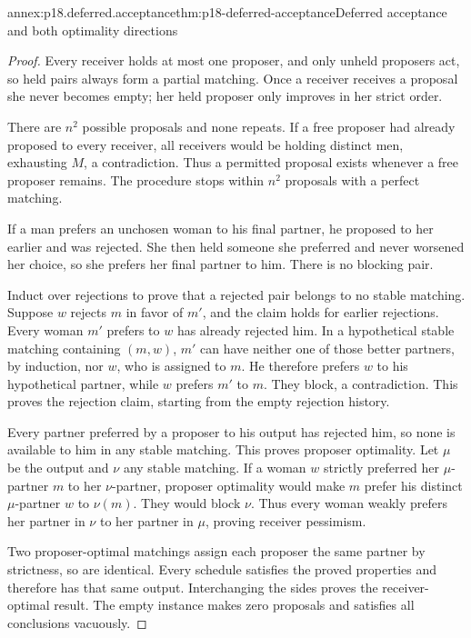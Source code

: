 \begin{annexitem}{annex:p18.deferred.acceptance}{thm:p18-deferred-acceptance}{Deferred acceptance and both optimality directions}
\begin{proof}
Every receiver holds at most one proposer,
and only unheld proposers act, so
held pairs always form a partial
matching. Once a receiver receives
a proposal she never becomes empty;
her held proposer only improves
in her strict order.

There are \(n^2\) possible proposals
and none repeats. If a free
proposer had already proposed to
every receiver, all receivers
would be holding distinct men,
exhausting \(M\), a contradiction.
Thus a permitted proposal exists
whenever a free proposer remains.
The procedure stops within
\(n^2\) proposals with a
perfect matching.

If a man prefers an unchosen
woman to his final partner,
he proposed to her earlier
and was rejected. She
then held someone she
preferred and never worsened
her choice, so she prefers
her final partner to him.
There is no blocking pair.

Induct over rejections to
prove that a rejected pair
belongs to no stable matching.
Suppose \(w\) rejects \(m\)
in favor of \(m'\), and
the claim holds for earlier
rejections. Every woman
\(m'\) prefers to \(w\)
has already rejected him.
In a hypothetical stable
matching containing \((m,w)\),
\(m'\) can have neither
one of those better
partners, by induction,
nor \(w\), who is
assigned to \(m\).
He therefore prefers
\(w\) to his hypothetical
partner, while \(w\)
prefers \(m'\) to \(m\).
They block, a contradiction.
This proves the rejection
claim, starting from the
empty rejection history.

Every partner preferred
by a proposer to his
output has rejected him,
so none is available
to him in any stable
matching. This proves
proposer optimality.
Let \(\mu\) be the output
and \(\nu\) any stable
matching. If a woman
\(w\) strictly preferred
her \(\mu\)-partner \(m\)
to her \(\nu\)-partner,
proposer optimality would
make \(m\) prefer his
distinct \(\mu\)-partner
\(w\) to \(\nu(m)\).
They would block \(\nu\).
Thus every woman weakly
prefers her partner in
\(\nu\) to her partner
in \(\mu\), proving
receiver pessimism.

Two proposer-optimal matchings
assign each proposer the
same partner by strictness,
so are identical. Every
schedule satisfies the
proved properties and
therefore has that same
output. Interchanging
the sides proves the
receiver-optimal result.
The empty instance
makes zero proposals
and satisfies all
conclusions vacuously.
\end{proof}
\end{annexitem}

